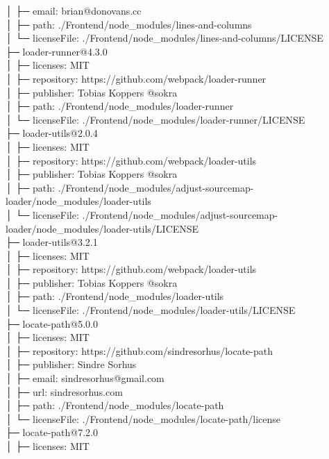 │  ├─ email: brian@donovans.cc\\
│  ├─ path: ./Frontend/node\_modules/lines-and-columns\\
│  └─ licenseFile: ./Frontend/node\_modules/lines-and-columns/LICENSE\\
├─ loader-runner@4.3.0\\
│  ├─ licenses: MIT\\
│  ├─ repository: https://github.com/webpack/loader-runner\\
│  ├─ publisher: Tobias Koppers @sokra\\
│  ├─ path: ./Frontend/node\_modules/loader-runner\\
│  └─ licenseFile: ./Frontend/node\_modules/loader-runner/LICENSE\\
├─ loader-utils@2.0.4\\
│  ├─ licenses: MIT\\
│  ├─ repository: https://github.com/webpack/loader-utils\\
│  ├─ publisher: Tobias Koppers @sokra\\
│  ├─ path: ./Frontend/node\_modules/adjust-sourcemap-loader/node\_modules/loader-utils\\
│  └─ licenseFile: ./Frontend/node\_modules/adjust-sourcemap-loader/node\_modules/loader-utils/LICENSE\\
├─ loader-utils@3.2.1\\
│  ├─ licenses: MIT\\
│  ├─ repository: https://github.com/webpack/loader-utils\\
│  ├─ publisher: Tobias Koppers @sokra\\
│  ├─ path: ./Frontend/node\_modules/loader-utils\\
│  └─ licenseFile: ./Frontend/node\_modules/loader-utils/LICENSE\\
├─ locate-path@5.0.0\\
│  ├─ licenses: MIT\\
│  ├─ repository: https://github.com/sindresorhus/locate-path\\
│  ├─ publisher: Sindre Sorhus\\
│  ├─ email: sindresorhus@gmail.com\\
│  ├─ url: sindresorhus.com\\
│  ├─ path: ./Frontend/node\_modules/locate-path\\
│  └─ licenseFile: ./Frontend/node\_modules/locate-path/license\\
├─ locate-path@7.2.0\\
│  ├─ licenses: MIT\\
